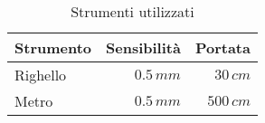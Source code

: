 \begin{table}[h!]
    \hspace{5mm} %
    \begin{tabular}{|l|r|r|}
        \hline
        Strumento & Sensibilità & Portata\\
        \hline
        Righello   & $0.5\,mm$ & $30\,cm$\\
        \hline
        Metro   & $0.5\,mm$ & $500\,cm$\\
        \hline
    \end{tabular}
    \caption{Strumenti utilizzati}
    \label{strumenti}
\end{table}
